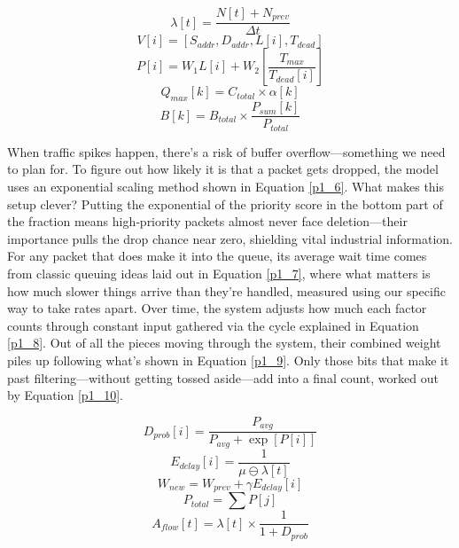 \documentclass[a4paper,fleqn]{cas-dc}
\numberwithin{equation}{section}
\begin{document}
\begin{equation} \lambda[t] = \frac{N[t] + N_{prev}}{\Delta t} \label{p1_1} \end{equation}
\begin{equation} V[i] = [ S_{addr}, D_{addr}, L[i], T_{dead} ] \label{p1_2} \end{equation}
\begin{equation} P[i] = W_{1} L[i] + W_{2} \left[ \frac{T_{max}}{T_{dead}[i]} \right] \label{p1_3} \end{equation}
\begin{equation} Q_{max}[k] = C_{total} \times \alpha[k] \label{p1_4} \end{equation}
\begin{equation} B[k] = B_{total} \times \frac{P_{sum}[k]}{P_{total}} \label{p1_5} \end{equation}

When traffic spikes happen, there's a risk of buffer overflow—something we need to plan for. To figure out how likely it is that a packet gets dropped, the model uses an exponential scaling method shown in Equation \ref{p1_6}. What makes this setup clever? Putting the exponential of the priority score in the bottom part of the fraction means high‑priority packets almost never face deletion—their importance pulls the drop chance near zero, shielding vital industrial information. For any packet that does make it into the queue, its average wait time comes from classic queuing ideas laid out in Equation \ref{p1_7}, where what matters is how much slower things arrive than they're handled, measured using our specific way to take rates apart. Over time, the system adjusts how much each factor counts through constant input gathered via the cycle explained in Equation \ref{p1_8}. Out of all the pieces moving through the system, their combined weight piles up following what's shown in Equation \ref{p1_9}. Only those bits that make it past filtering—without getting tossed aside—add into a final count, worked out by Equation \ref{p1_10}.

\begin{equation} D_{prob}[i] = \frac{P_{avg}}{P_{avg} + \exp[ P[i] ]} \label{p1_6} \end{equation}
\begin{equation} E_{delay}[i] = \frac{1}{\mu \ominus \lambda[t]} \label{p1_7} \end{equation}
\begin{equation} W_{new} = W_{prev} + \gamma E_{delay}[i] \label{p1_8} \end{equation}
\begin{equation} P_{total} = \sum P[j] \label{p1_9} \end{equation}
\begin{equation} A_{flow}[t] = \lambda[t] \times \frac{1}{1 + D_{prob}} \label{p1_10} \end{equation}
\end{document}
